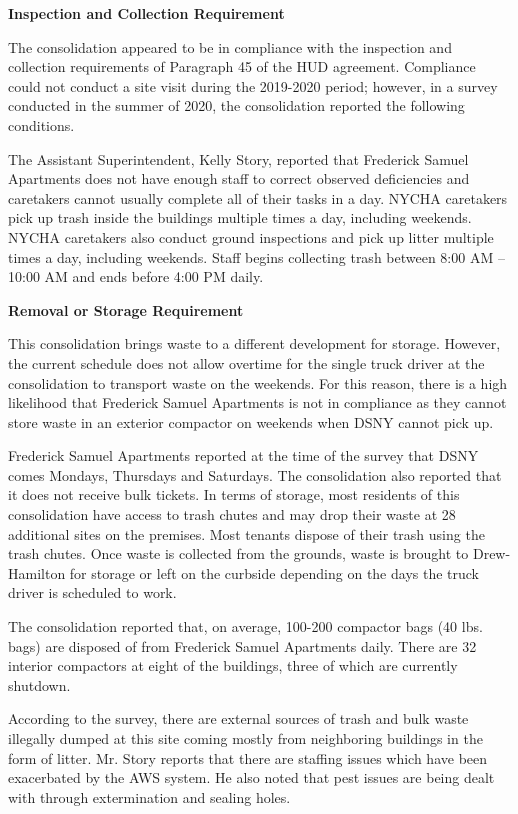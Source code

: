 
\textbf{Inspection and Collection Requirement}

The consolidation appeared to be in compliance with the inspection and collection requirements of Paragraph 45 of the HUD agreement. Compliance could not conduct a site visit during the 2019-2020 period; however, in a survey conducted in the summer of 2020, the consolidation reported the following conditions.

The Assistant Superintendent, Kelly Story, reported that Frederick Samuel Apartments does not have enough staff to correct observed deficiencies and caretakers cannot usually complete all of their tasks in a day. NYCHA caretakers pick up trash inside the buildings multiple times a day, including weekends. NYCHA caretakers also conduct ground inspections and pick up litter multiple times a day, including weekends. Staff begins collecting trash between 8:00 AM -- 10:00 AM and ends before 4:00 PM daily. 

\textbf{Removal or Storage Requirement}

This consolidation brings waste to a different development for storage. However, the current schedule does not allow overtime for the single truck driver at the consolidation to transport waste on the weekends. For this reason, there is a high likelihood that Frederick Samuel Apartments is not in compliance as they cannot store waste in an exterior compactor on weekends when DSNY cannot pick up.

Frederick Samuel Apartments reported at the time of the survey that DSNY comes Mondays, Thursdays and Saturdays. The consolidation also reported that it does not receive bulk tickets. In terms of storage, most residents of this consolidation have access to trash chutes and may drop their waste at 28 additional sites on the premises. Most tenants dispose of their trash using the trash chutes. Once waste is collected from the grounds, waste is brought to Drew-Hamilton for storage or left on the curbside depending on the days the truck driver is scheduled to work.

The consolidation reported that, on average, 100-200 compactor bags (40 lbs. bags) are disposed of from Frederick Samuel Apartments daily. There are 32 interior compactors at eight of the buildings, three of which are currently shutdown.

According to the survey, there are external sources of trash and bulk waste illegally dumped at this site coming mostly from neighboring buildings in the form of litter. Mr. Story reports that there are staffing issues which have been exacerbated by the AWS system. He also noted that pest issues are being dealt with through extermination and sealing holes.